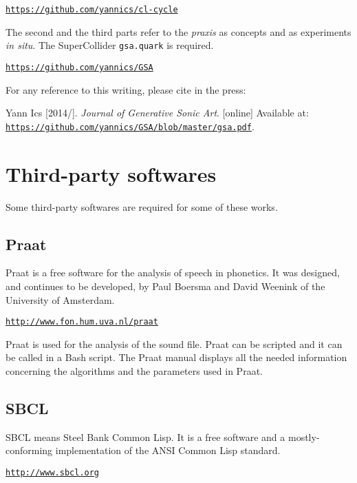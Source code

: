 \href{https://github.com/yannics/cl-cycle}{\texttt{\small https://github.com/yannics/cl-cycle}}

\newpage
The second and the third parts refer to the \textit{praxis} as concepts and as experiments \textit{in situ}. The SuperCollider \texttt{gsa.quark} is required.

\href{https://github.com/yannics/GSA}{\texttt{\small https://github.com/yannics/GSA}}

\bigskip

For any reference to this writing, please cite in the press: 

\noindent Yann Ics [2014/\the\year]. \textit{Journal of Generative Sonic Art}. [online] Available at: \href{https://github.com/yannics/GSA/blob/master/gsa.pdf}{\texttt{\small https://github.com/yannics/GSA/blob/master/gsa.pdf}}.

\section*{Third-party softwares}
\label{tps}

Some third-party softwares are required for some of these works. 

\subsection*{Praat}

Praat is a free software for the analysis of speech in phonetics. It was designed, and continues to be developed, by Paul Boersma and David Weenink of the University of Amsterdam. 

\href{http://www.fon.hum.uva.nl/praat}{\texttt{\small http://www.fon.hum.uva.nl/praat}}

\bigskip

Praat is used for the analysis of the sound file. Praat can be scripted and it can be called in a Bash script. The Praat manual displays all the needed information concerning the algorithms and the parameters used in Praat.

\subsection*{SBCL}

SBCL means Steel Bank Common Lisp. It is a free software and a mostly-conforming implementation of the ANSI Common Lisp standard.

\href{http://www.sbcl.org}{\texttt{\small http://www.sbcl.org}}

